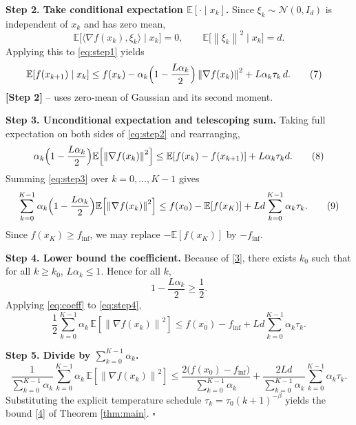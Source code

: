 \documentclass{article}
\newcommand{\E}{\mathbb{E}}
\newcommand{\norm}[1]{\left\|#1\right\|}
\begin{document}
\medskip
\noindent\textbf{Step 2. Take conditional expectation $\E[\cdot\mid x_{k}]$.}
Since $\xi_{k}\sim\mathcal N(0,I_{d})$ is independent of $x_{k}$ and has zero mean,
\[
\E\bigl[\langle \nabla f(x_{k}),\xi_{k}\rangle\mid x_{k}\bigr]=0,
\qquad 
\E\bigl[\norm{\xi_{k}}^{2}\mid x_{k}\bigr]=d .
\]
Applying this to \eqref{eq:step1} yields
\begin{align}
\E\!\left[f(x_{k+1})\mid x_{k}\right]
&\le f(x_{k}) -\alpha_{k}\Bigl(1-\frac{L\alpha_{k}}{2}\Bigr)\norm{\nabla f(x_{k})}^{2}
   +L\alpha_{k}\tau_{k}\,d .
   \tag{7}\label{eq:step2}
\end{align}
\noindent\textbf{[Step 2]} – uses zero‑mean of Gaussian and its second moment.

\medskip
\noindent\textbf{Step 3. Unconditional expectation and telescoping sum.}
Taking full expectation on both sides of \eqref{eq:step2} and rearranging,
\[
\alpha_{k}\Bigl(1-\frac{L\alpha_{k}}{2}\Bigr)\E\!\left[\norm{\nabla f(x_{k})}^{2}\right]
\le \E\!\left[f(x_{k})-f(x_{k+1})\right] + L\alpha_{k}\tau_{k}d .
\tag{8}\label{eq:step3}
\]
Summing \eqref{eq:step3} over $k=0,\dots,K-1$ gives
\begin{align}
\sum_{k=0}^{K-1}\alpha_{k}\Bigl(1-\frac{L\alpha_{k}}{2}\Bigr)
\E\!\left[\norm{\nabla f(x_{k})}^{2}\right]
\le f(x_{0})- \E\!\left[f(x_{K})\right] 
   + L d \sum_{k=0}^{K-1}\alpha_{k}\tau_{k}.
   \tag{9}\label{eq:step4}
\end{align}
Since $f(x_{K})\ge f_{\inf}$, we may replace $- \E[f(x_{K})]$ by $-f_{\inf}$.

\medskip
\noindent\textbf{Step 4. Lower bound the coefficient.}
Because of \eqref{3}, there exists $k_{0}$ such that for all $k\ge k_{0}$, $L\alpha_{k}\le 1$. Hence for all $k$,
\[
1-\frac{L\alpha_{k}}{2}\ge \frac12 .
\tag{10}\label{eq:coeff}
\]
Applying \eqref{eq:coeff} to \eqref{eq:step4},
\[
\frac12\sum_{k=0}^{K-1}\alpha_{k}\,
\E\!\left[\norm{\nabla f(x_{k})}^{2}\right]
\le f(x_{0})-f_{\inf}+ L d \sum_{k=0}^{K-1}\alpha_{k}\tau_{k}.
\tag{11}\label{eq:step5}
\]

\medskip
\noindent\textbf{Step 5. Divide by $\sum_{k=0}^{K-1}\alpha_{k}$.}
\[
\frac{1}{\sum_{k=0}^{K-1}\alpha_{k}}
\sum_{k=0}^{K-1}\alpha_{k}\,
\E\!\left[\norm{\nabla f(x_{k})}^{2}\right]
\le
\frac{2\bigl(f(x_{0})-f_{\inf}\bigr)}{\sum_{k=0}^{K-1}\alpha_{k}}
   +\frac{2L d}{\sum_{k=0}^{K-1}\alpha_{k}}
      \sum_{k=0}^{K-1}\alpha_{k}\tau_{k}.
\tag{12}\label{eq:step6}
\]
Substituting the explicit temperature schedule $\tau_{k}= \tau_{0}(k+1)^{-\beta}$ yields the bound \eqref{4} of Theorem \ref{thm:main}. \hfill $\square$
\end{document}
